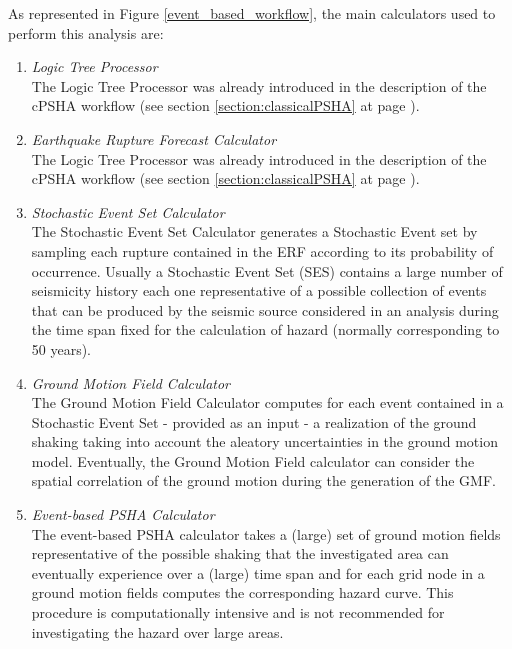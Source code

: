 As represented in Figure \ref{event_based_workflow}, the main calculators 
used to perform this analysis are:
\begin{enumerate}
%
\item \emph{Logic Tree Processor} \hfill \\
The Logic Tree Processor was already 
introduced in the description of the cPSHA workflow (see section 
\ref{section:classicalPSHA} at page \pageref{section:classicalPSHA}).
%
\item \emph{Earthquake Rupture Forecast Calculator} \hfill \\ 
The Logic Tree Processor was already 
introduced in the description of the cPSHA workflow (see section 
\ref{section:classicalPSHA} at page \pageref{section:classicalPSHA}).
%
\item \emph{Stochastic Event Set Calculator} \hfill \\
The Stochastic Event Set Calculator generates a Stochastic Event set 
by sampling each rupture contained in the ERF according to its 
probability of occurrence. Usually a Stochastic Event Set (SES) contains
a large number of seismicity history each one representative of a  
possible collection of events that can be produced by the seismic source
considered in an analysis during the time span fixed for the calculation
of hazard (normally corresponding to 50 years).
%
\item \emph{Ground Motion Field Calculator} \hfill \\
The Ground Motion Field Calculator computes for each event contained in a 
Stochastic Event Set - provided as an input - a realization of the 
ground shaking taking into account the aleatory uncertainties in 
the ground motion model. Eventually, the Ground Motion Field calculator 
can consider the spatial correlation of the ground motion during the 
generation of the GMF.
%
\item \emph{Event-based PSHA Calculator} \hfill \\
The event-based PSHA calculator takes a (large) set of ground motion 
fields representative of the possible shaking that the investigated 
area can eventually experience over a (large) time span and for each 
grid node in a ground motion fields computes the corresponding hazard 
curve. 
%
This procedure is computationally intensive and is not recommended for 
investigating the hazard over large areas. 
\end{enumerate}

